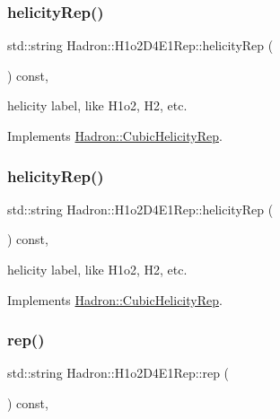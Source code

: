\subsubsection{\texorpdfstring{helicityRep()}{helicityRep()}\hspace{0.1cm}{\footnotesize\ttfamily [2/3]}}
{\footnotesize\ttfamily std\+::string Hadron\+::\+H1o2\+D4\+E1\+Rep\+::helicity\+Rep (\begin{DoxyParamCaption}{ }\end{DoxyParamCaption}) const\hspace{0.3cm}{\ttfamily [inline]}, {\ttfamily [virtual]}}

helicity label, like H1o2, H2, etc. 

Implements \mbox{\hyperlink{structHadron_1_1CubicHelicityRep_af1096946b7470edf0a55451cc662f231}{Hadron\+::\+Cubic\+Helicity\+Rep}}.

\mbox{\label{structHadron_1_1H1o2D4E1Rep_a0cd96ec9108f20afcba53d3bce1540fc}} 
\subsubsection{\texorpdfstring{helicityRep()}{helicityRep()}\hspace{0.1cm}{\footnotesize\ttfamily [3/3]}}
{\footnotesize\ttfamily std\+::string Hadron\+::\+H1o2\+D4\+E1\+Rep\+::helicity\+Rep (\begin{DoxyParamCaption}{ }\end{DoxyParamCaption}) const\hspace{0.3cm}{\ttfamily [inline]}, {\ttfamily [virtual]}}

helicity label, like H1o2, H2, etc. 

Implements \mbox{\hyperlink{structHadron_1_1CubicHelicityRep_af1096946b7470edf0a55451cc662f231}{Hadron\+::\+Cubic\+Helicity\+Rep}}.

\mbox{\label{structHadron_1_1H1o2D4E1Rep_a8657044b2491eb10846bc082432edb8e}} 
\subsubsection{\texorpdfstring{rep()}{rep()}\hspace{0.1cm}{\footnotesize\ttfamily [1/5]}}
{\footnotesize\ttfamily std\+::string Hadron\+::\+H1o2\+D4\+E1\+Rep\+::rep (\begin{DoxyParamCaption}{ }\end{DoxyParamCaption}) const\hspace{0.3cm}{\ttfamily [inline]}, {\ttfamily [virtual]}}



